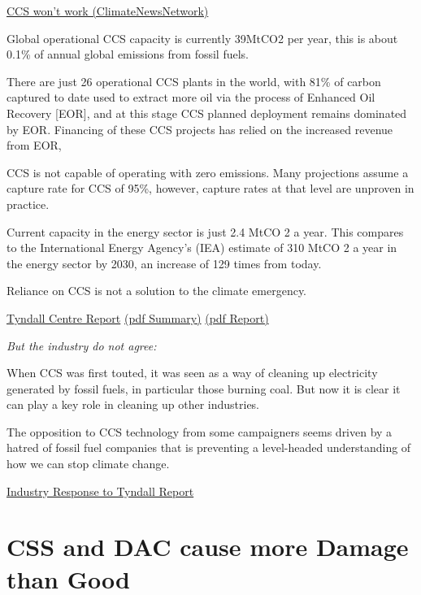 \documentclass[
]{book}
\begin{document}
\href{https://climatenewsnetwork.net/carbon-capture-and-storage-wont-work-critics-say/}{CCS won't work (ClimateNewsNetwork)}

Global operational CCS capacity is currently 39MtCO2 per year,
this is about 0.1\% of annual global emissions from fossil fuels.

There are just 26 operational CCS plants in the world,
with 81\% of carbon captured to date used to extract more oil
via the process of Enhanced Oil Recovery {[}EOR{]}, and at this stage
CCS planned deployment remains dominated by EOR.
Financing of these CCS projects has relied on the increased revenue from EOR,

CCS is not capable of operating with zero emissions.
Many projections assume a capture rate for CCS of 95\%, however,
capture rates at that level are unproven in practice.

Current capacity in the energy sector is just 2.4 MtCO 2 a year.
This compares to the International Energy Agency's (IEA) estimate of 310 MtCO 2 a year in the
energy sector by 2030, an increase of 129 times from today.

Reliance on CCS is not a solution to the climate emergency.

\href{https://foe.scot/resource/report-carbon-capture-storage-energy-role/}{Tyndall Centre Report}
\href{pdf/Tyndall_2020_CCS-Summary.pdf}{(pdf Summary)}
\href{pdf/Tyndall_2020_CCS-Report.pdf}{(pdf Report)}

\emph{But the industry do not agree:}

When CCS was first touted, it was seen as a way of cleaning up
electricity generated by fossil fuels, in particular those burning coal.
But now it is clear it can play a key role in cleaning up other industries.

The opposition to CCS technology from some campaigners seems
driven by a hatred of fossil fuel companies that is
preventing a level-headed understanding of how we can stop climate change.

\href{https://www.theguardian.com/environment/2021/jan/16/carbon-capture-vital-meeting-climate-goals-scientists-cut-emissions}{Industry Response to Tyndall Report}

\hypertarget{css-and-dac-cause-more-damage-than-good}{%
\section{CSS and DAC cause more Damage than Good}\label{css-and-dac-cause-more-damage-than-good}}
\end{document}
